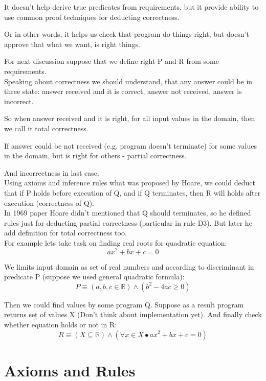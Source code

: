 \documentclass[twoside,twocolumn]{article}
\begin{document}
It doesn't help derive true predicates from requirements, but it
provide ability to use common proof techniques for deducting correctness.

Or in other words, it helps us check that program do things right, but doesn't
approve that what we want, is right things.

For next discussion suppose that we define right P and R from some
requirements. \\

Speaking about correctness we should understand, that any answer could be in
three state: answer received and it is correct, answer not received, answer is
incorrect.  

So when answer received and it is right, for all input values in the domain,
then we call it total correctness.

If answer could be not received (e.g. program doesn't terminate) for some values
in the domain, but is right for others - partial correctness.

And incorrectness in last case. \\

Using axioms and inference rules what was proposed by Hoare, we could deduct
that if P holds before execution of Q, and if Q terminates, then R will holds
after execution (correctness of Q).\\

In 1969 paper Hoare didn't mentioned that Q should terminates, so he defined
rules just for deducting partial correctness (particular in rule D3). But later
he add definition for total correctness too. \\

For example lets take task on finding real roots for quadratic equation:
$$ ax^2 + bx + c = 0$$

We limits input domain as set of real numbers and according to discriminant in
predicate P (suppose we used general quadratic formula):
$$ P \equiv (a, b, c \in \mathbb{R}) \wedge (b^2 - 4ac \geq 0)$$

Then we could find values by some program Q. Suppose as a result program returns
set of values X (Don't think about implementation yet).
And finally check whether equation holds or not in R: 
$$ R \equiv (X \subseteq \mathbb{R}) \wedge (\forall x \in X \bullet ax^2 + bx + c
= 0)$$

\section{Axioms and Rules}
\end{document}
